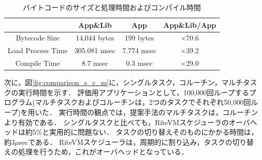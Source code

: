 \documentclass[submit,techrep]{ipsj}
\begin{document}

\begin{table}[t]
    \centering
    \caption{バイトコードのサイズと処理時間およびコンパイル時間}
    {\tabcolsep=0.1cm
    \begin{tabular}{c||c|c|c}
                            & App\&Lib     & App        &   App\&Lib/App  \\ \hline
          Bytecode Size     & 14,044 bytes & 199 bytes  &   $\times$70.6          \\ %
          Load Process Time & 305.081 msec & 7.774 msec &   $\times$39.2          \\
          Compile Time      & 8.7 msec     & 0.3 msec   &   $\times$29.0          \\
    \end{tabular}
    }
    \vspace{-5mm}
    \label{tab:size_and_time}
\end{table}

次に，図\ref{fig:comparison_s_c_m}に，シングルタスク，コルーチン，マルチタスクの実行時間を示す．
評価用アプリケーションとして，100,000回ループするプログラム(マルチタスクおよびコルーチンは，2つのタスクでそれぞれ50,000回ループ)を用いた．
実行時間の観点では，提案手法のマルチタスクは，コルーチンより有効である．
シングルタスクと比べても，RiteVMスケジューラのオーバヘッドは約5\%と実用的に問題ない．
タスクの切り替えそのものにかかる時間は，約3$\mu$secである．
RiteVMスケジューラは，周期的に割り込み，タスクの切り替えの処理を行うため，これがオーバヘッドとなっている．
\end{document}
